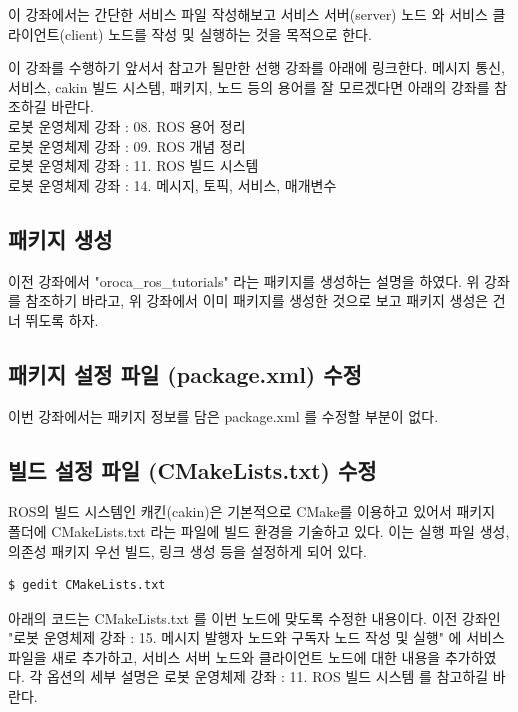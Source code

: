 이 강좌에서는 간단한 서비스 파일 작성해보고 서비스 서버(server) 노드 와 서비스 클라이언트(client) 노드를 작성 및 실행하는 것을 목적으로 한다.

이 강좌를 수행하기 앞서서 참고가 될만한 선행 강좌를 아래에 링크한다. 메시지 통신, 서비스, cakin 빌드 시스템, 패키지, 노드 등의 용어를 잘 모르겠다면 아래의 강좌를 참조하길 바란다.\\

로봇 운영체제 강좌 : 08. ROS 용어 정리\\
로봇 운영체제 강좌 : 09. ROS 개념 정리\\
로봇 운영체제 강좌 : 11. ROS 빌드 시스템\\
로봇 운영체제 강좌 : 14. 메시지, 토픽, 서비스, 매개변수\\

\subsection{패키지 생성}

이전 강좌에서 "oroca\_ros\_tutorials" 라는 패키지를 생성하는 설명을 하였다. 위 강좌를 참조하기 바라고, 위 강좌에서 이미 패키지를 생성한 것으로 보고 패키지 생성은 건너 뛰도록 하자.

\subsection{패키지 설정 파일 (package.xml) 수정}

이번 강좌에서는 패키지 정보를 담은 package.xml 를 수정할 부분이 없다.

\subsection{빌드 설정 파일 (CMakeLists.txt) 수정}

ROS의 빌드 시스템인 캐킨(cakin)은 기본적으로 CMake를 이용하고 있어서 패키지 폴더에 CMakeLists.txt 라는 파일에 빌드 환경을 기술하고 있다. 이는 실행 파일 생성, 의존성 패키지 우선 빌드, 링크 생성 등을 설정하게 되어 있다.

\begin{lstlisting}[language=ROS]
$ gedit CMakeLists.txt 
\end{lstlisting}

아래의 코드는 CMakeLists.txt 를 이번 노드에 맞도록 수정한 내용이다. 이전 강좌인 "로봇 운영체제 강좌 : 15. 메시지 발행자 노드와 구독자 노드 작성 및 실행" 에 서비스 파일을 새로 추가하고, 서비스 서버 노드와 클라이언트 노드에 대한 내용을 추가하였다. 각 옵션의 세부 설명은 로봇 운영체제 강좌 : 11. ROS 빌드 시스템 를 참고하길 바란다.

